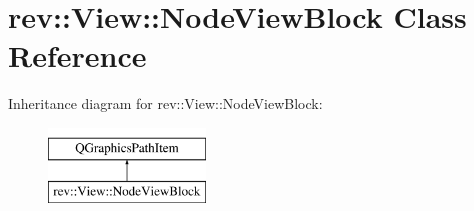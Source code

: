 \hypertarget{classrev_1_1_view_1_1_node_view_block}{}\section{rev\+::View\+::Node\+View\+Block Class Reference}
\label{classrev_1_1_view_1_1_node_view_block}
Inheritance diagram for rev\+::View\+::Node\+View\+Block\+:\begin{figure}[H]
\begin{center}
\leavevmode
\includegraphics[height=2.000000cm]{classrev_1_1_view_1_1_node_view_block}
\end{center}
\end{figure}
